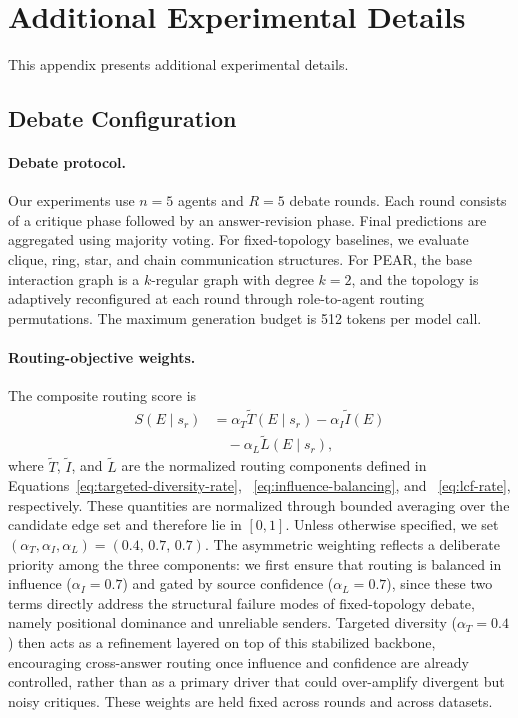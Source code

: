 \newpage
\twocolumn

\section{Additional Experimental Details}
\label{app:exps}

This appendix presents additional experimental details.

\subsection{Debate Configuration}
\label{app:debate}

\paragraph{Debate protocol.}
Our experiments use $n=5$ agents and $R=5$ debate rounds. Each round consists of a critique phase followed by an answer-revision phase. Final predictions are aggregated using majority voting. For fixed-topology baselines, we evaluate clique, ring, star, and chain communication structures. For PEAR, the base interaction graph is a $k$-regular graph with degree $k=2$, and the topology is adaptively reconfigured at each round through role-to-agent routing permutations. The maximum generation budget is 512 tokens per model call.


\paragraph{Routing-objective weights.}
The composite routing score is
\begin{equation}
\begin{aligned}
S(E \mid s_r)
&= \alpha_T \widetilde{T}(E \mid s_r)
 - \alpha_I \widetilde{I}(E) \\
&\quad
 - \alpha_L \widetilde{L}(E \mid s_r),
\end{aligned}
\end{equation}
where $\widetilde{T}$, $\widetilde{I}$, and $\widetilde{L}$ are the normalized routing components defined in
Equations~\ref{eq:targeted-diversity-rate}, ~\ref{eq:influence-balancing}, and ~\ref{eq:lcf-rate}, respectively. 
These quantities are normalized through bounded averaging over the candidate edge set and therefore lie in $[0,1]$.
Unless otherwise specified, we set $(\alpha_T,\alpha_I,\alpha_L)=(0.4,\,0.7,\,0.7)$. The asymmetric weighting reflects a deliberate priority among the three components: we first ensure that routing is balanced in influence ($\alpha_I=0.7$) and gated by source confidence ($\alpha_L=0.7$), since these two terms directly address the structural failure modes of fixed-topology debate, namely positional dominance and unreliable senders. Targeted diversity ($\alpha_T=0.4$) then acts as a refinement layered on top of this stabilized backbone, encouraging cross-answer routing once influence and confidence are already controlled, rather than as a primary driver that could over-amplify divergent but noisy critiques. These weights are held fixed across rounds and across datasets.
 
